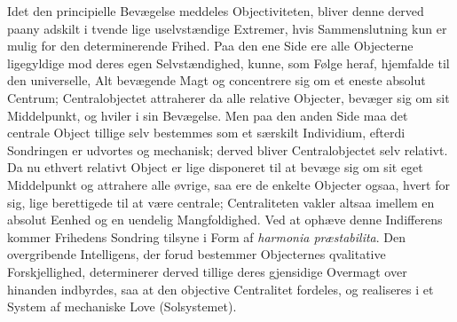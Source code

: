 \documentclass[12pt]{book}
\newcommand{\anm}[1]{\emph{\textbf{Anm.~#1.}}}
\newcommand{\opage}[1]{\marginnote{\footnotesize\textit{[#1]}}}
\begin{document}
Idet den principielle Bevægelse meddeles Objectiviteten, bliver denne derved paany
adskilt i tvende lige uselvstændige Extremer, hvis Sammenslutning kun er mulig for den
determinerende Frihed. Paa den ene Side ere alle Objecterne ligegyldige mod deres egen
Selvstændighed, kunne, som Følge heraf, hjemfalde til den universelle, Alt bevægende
Magt og concentrere sig om et eneste absolut Centrum; Centralobjectet attraherer da alle
relative Objecter, bevæger sig om sit Middelpunkt, og hviler i sin Bevægelse. Men paa
den anden Side maa det centrale Object tillige selv bestemmes som et særskilt
Individium, efterdi Sondringen er udvortes og mechanisk; derved bliver Centralobjectet
selv relativt. Da nu ethvert relativt Object er lige disponeret til at bevæge sig om sit
eget Middelpunkt og attrahere alle øvrige,
\opage{212} %
%
%
%
%
%
saa ere de enkelte Objecter ogsaa, hvert for sig, lige berettigede til at være centrale;
Centraliteten vakler altsaa imellem en absolut Eenhed og en uendelig Mangfoldighed. Ved
at ophæve denne Indifferens kommer Frihedens Sondring tilsyne i Form af
\textit{harmonia præstabilita}. Den overgribende Intelligens, der forud bestemmer
Objecternes qvalitative Forskjellighed, determinerer derved tillige deres gjensidige
Overmagt over hinanden indbyrdes, saa at den objective Centralitet fordeles, og
realiseres i et System af mechaniske Love (Solsystemet).
\end{document}
